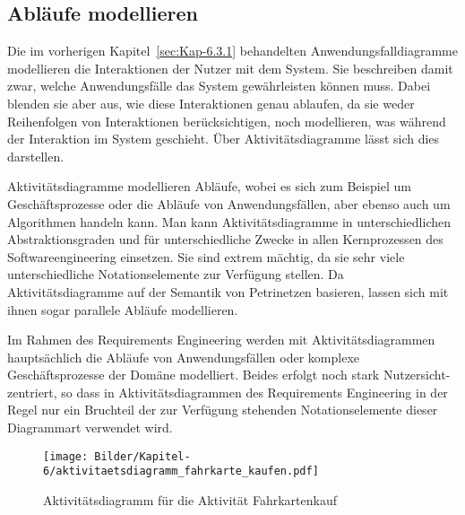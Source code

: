 \subsection{Abläufe modellieren}
\label{sec:Kap-6.3.2}

Die im vorherigen Kapitel~\ref{sec:Kap-6.3.1} behandelten Anwendungsfalldiagramme modellieren die Interaktionen der Nutzer mit dem System. Sie beschreiben damit zwar, welche Anwendungsfälle das System gewährleisten können muss. Dabei blenden sie aber aus, wie diese Interaktionen genau ablaufen, da sie weder Reihenfolgen von Interaktionen berücksichtigen, noch modellieren, was während der Interaktion im System geschieht. Über Aktivitätsdiagramme lässt sich dies darstellen.

Aktivitätsdiagramme modellieren Abläufe, wobei es sich zum Beispiel um Geschäftsprozesse oder die Abläufe von Anwendungsfällen, aber ebenso auch um Algorithmen handeln kann. Man kann Aktivitätsdiagramme in unterschiedlichen Abstraktionsgraden und für unterschiedliche Zwecke in allen Kernprozessen des Softwareengineering einsetzen. Sie sind extrem mächtig, da sie sehr viele unterschiedliche Notationselemente zur Verfügung stellen. Da Aktivitätsdiagramme auf der Semantik von Petrinetzen basieren, lassen sich mit ihnen sogar parallele Abläufe modellieren.


Im Rahmen des Requirements Engineering werden mit Aktivitätsdiagrammen hauptsächlich die Abläufe von Anwendungsfällen oder komplexe Geschäftsprozesse der Domäne modelliert. Beides erfolgt noch stark Nutzersicht-zentriert, so dass in Aktivitätsdiagrammen des Requirements Engineering in der Regel nur ein Bruchteil der zur Verfügung stehenden Notationselemente dieser Diagrammart verwendet wird.

\begin{figure}
	\centering
	\texttt{[image: Bilder/Kapitel-6/aktivitaetsdiagramm\_fahrkarte\_kaufen.pdf]}
	\caption{Aktivitätsdiagramm für die Aktivität Fahrkartenkauf}
	\label{fig:aktivitaetsdiagramm_fahrkarte_kaufen}
\end{figure}

